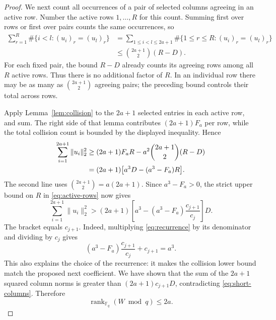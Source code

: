 \documentclass[11pt,letterpaper]{article}
\numberwithin{equation}{section}
\theoremstyle{definition}
\theoremstyle{remark}
\DeclareMathOperator{\rank}{rank}
\newcommand{\F}{\mathbb F}
\begin{document}
\begin{proof}
We next count all occurrences of a pair of selected columns agreeing in an active row. Number the active rows $1,\ldots,R$ for this count. Summing first over rows or first over pairs counts the same occurrences, so
\[
\begin{aligned}
 \sum_{r=1}^R\#\{i<l:(u_i)_r=(u_l)_r\}
 &=\sum_{1\le i<l\le2a+1}
       \#\{1\le r\le R:(u_i)_r=(u_l)_r\}\\
 &\le\binom{2a+1}{2}(R-D).
\end{aligned}
\]
For each fixed pair, the bound $R-D$ already counts its agreeing rows among all $R$ active rows. Thus there is no additional factor of $R$. In an individual row there may be as many as $\binom{2a+1}{2}$ agreeing pairs; the preceding bound controls their total across rows.

Apply Lemma~\ref{lem:collision} to the $2a+1$ selected entries in each active row, and sum. The right side of that lemma contributes $(2a+1)F_a$ per row, while the total collision count is bounded by the displayed inequality. Hence
\begin{align}
 \sum_{i=1}^{2a+1}\|u_i\|_2^2
 &\ge(2a+1)F_aR-a^2\binom{2a+1}{2}(R-D)\notag\\
 &=(2a+1)\bigl[a^3D-(a^3-F_a)R\bigr].
 \label{eq:collision-sum}
\end{align}
The second line uses $\binom{2a+1}{2}=a(2a+1)$. Since $a^3-F_a>0$, the strict upper bound on $R$ in \eqref{eq:active-rows} now gives
\[
 \sum_{i=1}^{2a+1}\|u_i\|_2^2
 >(2a+1)\left[a^3-(a^3-F_a)\frac{c_{j+1}}{c_j}\right]D.
\]
The bracket equals $c_{j+1}$. Indeed, multiplying \eqref{eq:recurrence} by its denominator and dividing by $c_j$ gives
\[
 (a^3-F_a)\frac{c_{j+1}}{c_j}+c_{j+1}=a^3.
\]
This also explains the choice of the recurrence: it makes the collision lower bound match the proposed next coefficient. We have shown that the sum of the $2a+1$ squared column norms is greater than $(2a+1)c_{j+1}D$, contradicting \eqref{eq:short-columns}. Therefore
\begin{equation}\label{eq:mod-rank}
 \rank_{\F_q}(W\bmod q)\le2a.
\end{equation}


\end{proof}
\end{document}
